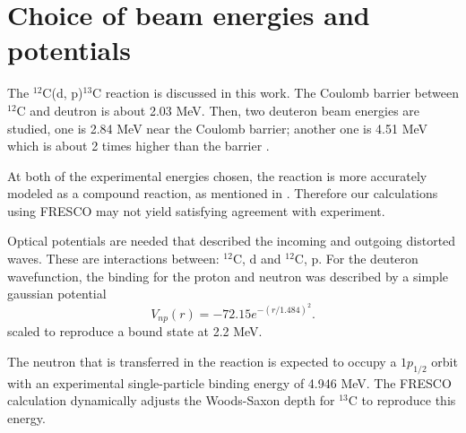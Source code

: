 \section{Choice of beam energies and potentials} \label{part1}
	The $^{12}$C(d, p)$^{13}$C reaction is discussed in this work. 
	The Coulomb barrier between $^{12}$C and deutron is about 2.03 MeV.
	Then, two deuteron beam energies are studied, one is 2.84 MeV near the Coulomb barrier; another one is 4.51 MeV which is about 2 times higher than the barrier .
	
	At both of the experimental energies chosen, the reaction is more accurately modeled as a compound reaction, as mentioned in \cite{PhysRev.101.209}.
	Therefore our calculations using FRESCO may not yield satisfying agreement with experiment.
	
	Optical potentials are needed that described the incoming and outgoing distorted waves.  
	These are interactions between: $^{12}$C, d \cite{PhysRevC.73.054605} and $^{12}$C, p\cite{PTCOG}.
	For the deuteron wavefunction, the binding for the proton and neutron was described by a simple gaussian potential 
	\begin{equation}
		V_{np}(r)=-72.15e^{-(r/1.484)^2}.
	\end{equation}
	scaled to reproduce a bound state at 2.2 MeV.
	
	The neutron that is transferred in the reaction is expected to occupy a $1p_{1/2}$ orbit with an experimental single-particle binding energy of 4.946 MeV. 
	The FRESCO calculation dynamically adjusts the Woods-Saxon depth for $^{13}$C to reproduce this energy.
	
	